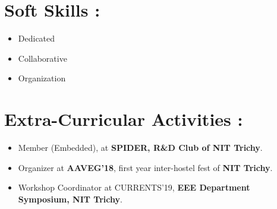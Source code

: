 \documentclass[a4paper, 12 pt]{article}
\begin{document}
\section*{Soft Skills :}
\begin{itemize}
\item Dedicated
\item Collaborative
\item Organization
\end{itemize}
\section*{Extra-Curricular Activities :}
\begin{itemize}
\item Member (Embedded), at {\bf SPIDER, R\&D Club of NIT Trichy}.
\item Organizer at {\bf AAVEG’18}, first year inter-hostel fest of {\bf NIT Trichy}.
\item Workshop Coordinator at CURRENTS’19, {\bf EEE Department Symposium, NIT Trichy}.
\end{itemize}
\end{document}
